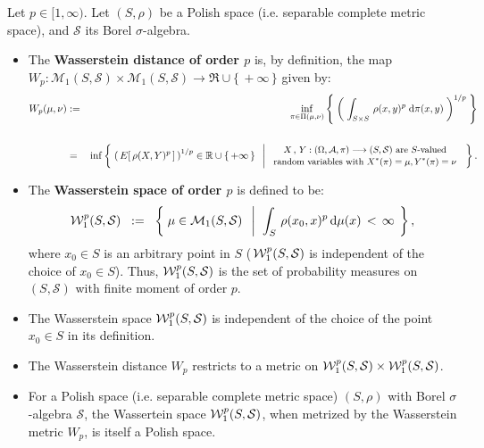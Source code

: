\begin{definition}
\mbox{}\vskip 0.1cm
\noindent
Let $p \in [1,\infty)$.
Let $\left(S,\rho\right)$ be a Polish space (i.e. separable complete metric space),
and $\mathcal{S}$ its Borel $\sigma$-algebra.
\begin{itemize}
\item
	The \textbf{Wasserstein distance of order $p$} is, by definition, the map
	$W_{p} : \mathcal{M}_{1}\!\left(S,\mathcal{S}\right) \times \mathcal{M}_{1}\!\left(S,\mathcal{S}\right)
	\longrightarrow \Re\cup\{\,+\infty\,\}$
	given by:
	\begin{eqnarray*}
	W_{p}\!\left(\mu,\nu\right)
	& := &
	\inf_{\pi\in\Pi(\mu,\nu)}
	\left\{\;
	\left(\;
	\int_{S \times S}\,\rho(x,y)^{p} \;\textnormal{d}\pi(x,y)
	\;\right)^{1/p}
	\;\right\}
	\\ \\
	& = &
	\inf\left\{\;
	\left(\,E\!\left[\,\rho(X,Y)^{p}\,\right]\,\right)^{1/p} \in \mathbb{R}\cup\{\,+\infty\,\}
	\;\;\left\vert\;
	\begin{array}{c}
	\textnormal{\small$X\,,\,Y : (\Omega,\mathcal{A},\pi) \longrightarrow (S,\mathcal{S})$ are $S$-valued}
	\\
	\textnormal{\small random variables with $X^{*}(\pi) = \mu, Y^{*}(\pi) = \nu$}
	\end{array}
	\right.
	\;\right\}.
	\end{eqnarray*}
\item
	The \textbf{Wasserstein space of order $p$} is defined to be:
	\begin{equation*}
		\mathcal{W}^{p}_{1}\!\left(S,\mathcal{S}\right)
		\;\; := \;\;
		\left\{\;
		\mu \in \mathcal{M}_{1}\!\left(S,\mathcal{S}\right)
		\;\;\left\vert\;\;
		\int_{S}\,\rho(x_{0},x)^{p}\,\textnormal{d}\mu(x) \, < \, \infty
		\right.
		\;\right\},
	\end{equation*}
	where $x_{0} \in S$ is an arbitrary point in $S$
	(\,$\mathcal{W}^{p}_{1}\!\left(S,\mathcal{S}\right)$ is independent of the choice of $x_{0} \in S$).
	Thus, $\mathcal{W}^{p}_{1}\!\left(S,\mathcal{S}\right)$ is the set of probability measures
	on	$\left(S,\mathcal{S}\right)$ with finite moment of order $p$.
\end{itemize}
\end{definition}

\begin{theorem}
\mbox{}\vskip0cm
\begin{itemize}
\item
	The Wasserstein space $\mathcal{W}^{p}_{1}\!\left(S,\mathcal{S}\right)$ is independent of the
	choice of the point $x_{0} \in S$ in its definition.
\item
	The Wasserstein distance $W_{p}$ restricts to a metric on
	$\mathcal{W}^{p}_{1}\!\left(S,\mathcal{S}\right) \times \mathcal{W}^{p}_{1}\!\left(S,\mathcal{S}\right)$.
\item
	For a Polish space (i.e. separable complete metric space) $(S,\rho)$
	with Borel $\sigma$-algebra $\mathcal{S}$,
	the Wassertein space $\mathcal{W}^{p}_{1}\!\left(S,\mathcal{S}\right)$,
	when metrized by the Wasserstein metric $W_{p}$, is itself a Polish space.
\end{itemize}
\end{theorem}

